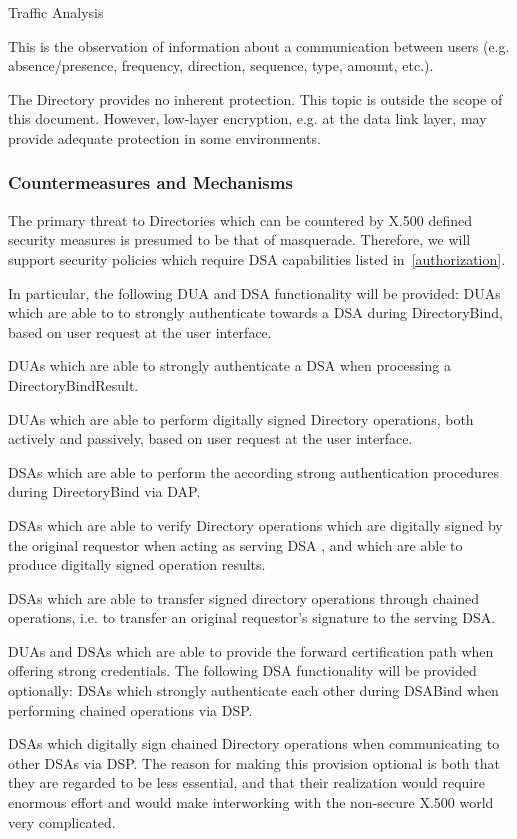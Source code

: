 \m Traffic Analysis

This is the observation of information about a communication between users
(e.g. absence/presence, frequency, direction, sequence, type, amount, etc.).

The Directory provides no inherent protection. This topic is outside the scope
of this document. However, low-layer encryption, e.g. at the data link layer,
may provide adequate protection in some environments.


\subsubsection{Countermeasures and Mechanisms}

The primary threat to Directories which can be countered by X.500 defined
security measures is presumed to be that of masquerade. Therefore, we will
support security policies which require DSA capabilities listed in~\ref{authorization}.

In particular, the following DUA and DSA functionality will be provided:
\bi
\m DUAs which are able to to strongly authenticate towards
  a DSA during DirectoryBind, based on user request at the user interface.

\m DUAs which are able to strongly authenticate a DSA when
  processing a DirectoryBindResult.

\m DUAs which are able to perform digitally signed Directory
  operations, both actively and passively, based on user request at the user 
  interface.

\m DSAs which are able to perform the according strong 
  authentication procedures during DirectoryBind via DAP.

\m DSAs which are able to verify Directory operations which are
  digitally signed by the original requestor when acting as serving DSA , and
  which are able to produce digitally signed operation results.

\m DSAs which are able to transfer signed directory operations
  through chained operations, i.e. to transfer an original requestor's signature
  to the serving DSA.

\m DUAs and DSAs which are able to provide the forward certification
  path when offering strong credentials.
\ei
The following DSA functionality will be provided optionally:
\bi
\m DSAs which strongly authenticate each other during DSABind when performing
  chained operations via DSP.

\m DSAs which digitally sign chained Directory operations when communicating
  to other DSAs via DSP.
\ei
The reason for making this provision optional is both that they are regarded 
to be less essential, and that their realization would require
enormous effort and would make interworking with the non-secure X.500 world
very complicated.

